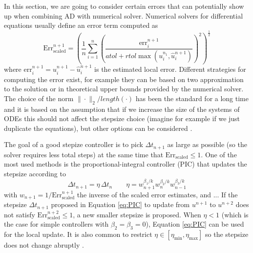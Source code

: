\label{appendix:dual-number-solver}

In this section, we are going to consider certain errors that can potentially show up when combining AD with numerical solver. 
Numerical solvers for differential equations usually define an error term computed as \cite{hairer-solving-1, Rackauckas_Nie_2016}
\begin{equation}
    \text{Err}_\text{scaled}^{n+1}
    =
    \left( \frac{1}{n} \sum_{i=1}^n \left( \frac{\text{err}_i^{n+1}}{atol + rtol \max (u_i^{n_1}, \hat u_i^{n+1})} \right)^2 \right)^{\frac{1}{2}}
    \label{eq:internal-norm-wrong}
\end{equation}
where $\text{err}_i^{n+1} = u_i^{n+1} - \hat u_i^{n+1}$ is the estimated local error.
Different strategies for computing the error exist, for example they can be based on two approximation to the solution or in theoretical upper bounds provided by the numerical solver. 
The choice of the norm $\| \cdot \|_2 / length(\cdot)$ has been the standard for a long time\cite{Ranocha_Dalcin_Parsani_Ketcheson_2022} and it is based on the assumption that if we increase the size of the systems of ODEs this should not affect the stepsize choice (imagine for example if we just duplicate the equations), but other options can be considered \cite{hairer-solving-1}.   

The goal of a good stepize controller is to pick $\Delta t_{n+1}$ as large as possible (so the solver requires less total steps) at the same time that $\text{Err}_\text{scaled} \leq 1$. 
One of the most used methods is the proportional-integral controller (PIC) that updates the stepsize according to \cite{Ranocha_Dalcin_Parsani_Ketcheson_2022}
\begin{equation}
    \Delta t_{n+1} = \eta \, \Delta t_n
    \qquad 
    \eta = w_{n+1}^{\beta_1 / k} w_n^{\beta_2 / k} w_{n-1}^{\beta_3 / k}
    \label{eq:PIC}
\end{equation}
with $w_{n+1} = 1 / \text{Err}_\text{scaled}^{n+1}$ the inverse of the scaled error estimates, and ...
If the stepsize $\Delta t_{n+1}$ proposed in Equation \eqref{eq:PIC} to update from $u^{n+1}$ to $u^{n+2}$ does not satisfy $\text{Err}_\text{scaled}^{n+2} \leq 1$, a new smaller stepsize is proposed. 
When $\eta < 1$ (which is the case for simple controllers with $\beta_2 = \beta_3 = 0$), Equation \eqref{eq:PIC} can be used for the local update. 
It is also common to restrict $\eta \in [\eta_\text{min}, \eta_\text{max}]$ so the stepsize does not change abruptly \cite{hairer-solving-1}. 

